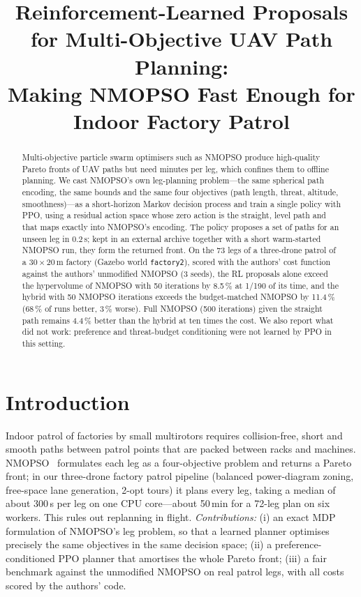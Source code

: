 \documentclass[conference]{IEEEtran}
\title{Reinforcement-Learned Proposals for Multi-Objective UAV Path Planning:\\
Making NMOPSO Fast Enough for Indoor Factory Patrol}
\author{\IEEEauthorblockN{Bharath Vaaishnav}}
\begin{document}
\maketitle

\begin{abstract}
Multi-objective particle swarm optimisers such as NMOPSO produce high-quality Pareto fronts of UAV
paths but need minutes per leg, which confines them to offline planning. We cast NMOPSO's own
leg-planning problem---the same spherical path encoding, the same bounds and the same four objectives
(path length, threat, altitude, smoothness)---as a short-horizon Markov decision process and train a
single policy with PPO, using a residual action space whose zero action is the straight, level path
and that maps exactly into NMOPSO's encoding. The policy proposes a set of paths for an unseen leg in
0.2\,s; kept in an external archive together with a short warm-started NMOPSO run, they form the
returned front. On the 73 legs of a three-drone patrol of a 30\,$\times$\,20\,m factory (Gazebo world
\texttt{factory2}), scored with the authors' cost function against the authors' unmodified NMOPSO
(3 seeds), the RL proposals alone exceed the hypervolume of NMOPSO with 50 iterations by 8.5\,\% at
1/190 of its time, and the hybrid with 50 NMOPSO iterations exceeds the budget-matched NMOPSO by
11.4\,\% (68\,\% of runs better, 3\,\% worse). Full NMOPSO (500 iterations) given the straight path
remains 4.4\,\% better than the hybrid at ten times the cost. We also report what did not work:
preference and threat-budget conditioning were not learned by PPO in this setting.
\end{abstract}

\section{Introduction}
Indoor patrol of factories by small multirotors requires collision-free, short and smooth paths
between patrol points that are packed between racks and machines. NMOPSO~\cite{nmopso} formulates
each leg as a four-objective problem and returns a Pareto front; in our three-drone factory patrol
pipeline (balanced power-diagram zoning, free-space lane generation, 2-opt tours) it plans every leg,
taking a median of about 300\,s per leg on one CPU core---about 50\,min for a 72-leg plan on six
workers. This rules out replanning in flight.
\emph{Contributions:} (i) an exact MDP formulation of NMOPSO's leg problem, so that a learned planner
optimises precisely the same objectives in the same decision space; (ii) a preference-conditioned
PPO planner that amortises the whole Pareto front; (iii) a fair benchmark against the unmodified
NMOPSO on real patrol legs, with all costs scored by the authors' code.
\end{document}
